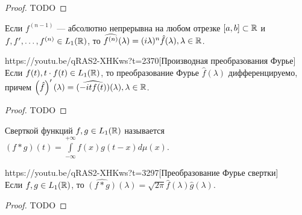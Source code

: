 \begin{proof}
	TODO
\end{proof}

\begin{corollary}
	Если $f^{(n-1)}$ --- абсолютно непрерывна на любом отрезке $[a,b]\subset\mathbb{R}$ и $f,f',\ldots,f^{(n)}\in L_1(\mathbb{R})$, то $\widehat{f^{(n)}}(\lambda)=(i\lambda)^n\hat{f}(\lambda),\lambda\in\mathbb{R}$.
\end{corollary}

\begin{linkthm}{https://youtu.be/qRAS2-XHKws?t=2370}[Производная преобразования Фурье]\ \\ 
	Если $f(t),t\cdot f(t)\in L_1(\mathbb{R})$, то преобразование Фурье $\hat{f}(\lambda)$ дифференцируемо, причем $\left(\hat{f}\right)'(\lambda)=\widehat{(-itf(t))}(\lambda), \lambda\in\mathbb{R}$.
\end{linkthm}

\begin{proof}
	TODO
\end{proof}

\begin{Def}
	Сверткой функций $f,g\in L_1(\mathbb{R})$ называется $(f\ast g)(t)=\int\limits_{-\infty}^{+\infty}f(x)g(t-x)d\mu(x)$.
\end{Def}
\begin{linkthm}{https://youtu.be/qRAS2-XHKws?t=3297}[Преобразование Фурье свертки]\ \\
	Если $f,g\in L_1(\mathbb{R})$, то $\widehat{(f\ast g)}(\lambda)=\sqrt{2\pi}\hat{f}(\lambda)\hat{g}(\lambda)$.
\end{linkthm}
\begin{proof}
	TODO
\end{proof}








